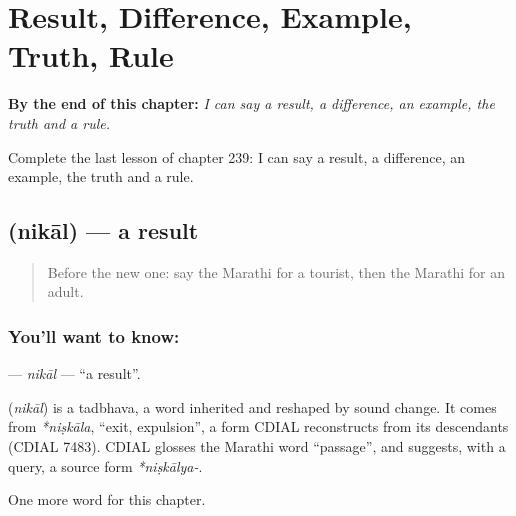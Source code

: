 
\chapter{Result, Difference, Example, Truth, Rule}
\label{ch:mr-result-difference-example-truth-rule}

\begin{chapteropening}
\textbf{By the end of this chapter:} \emph{I can say a result, a difference, an example, the truth and a rule.}

Complete the last lesson of chapter 239: I can say a result, a difference, an example, the truth and a rule.
\end{chapteropening}

\section[\texorpdfstring{\mr{निकाल} (nikāl)}{निकाल (nikāl)}]{ (nikāl) — a result}

\label{lesson:MR-C239-nikal}



\begin{quote}
Before the new one: say the Marathi for a tourist, then the Marathi for an adult.
\end{quote}

\subsection*{You'll want to know: }
\textbf{} — \emph{nikāl} — \textquotedblleft{}a result\textquotedblright{}.

\begin{cousinweb}
\textbf{} (\emph{nikāl}) is a tadbhava, a word inherited and reshaped by sound change. It comes from \emph{*niṣkāla}, \textquotedblleft{}exit, expulsion\textquotedblright{}, a form CDIAL reconstructs from its descendants (CDIAL 7483). CDIAL glosses the Marathi word \textquotedblleft{}passage\textquotedblright{}, and suggests, with a query, a source form \emph{*niṣkālya-}.
\end{cousinweb}

\begin{grammarlens}[title={What you've built}]
One more word for this chapter.
\end{grammarlens}

